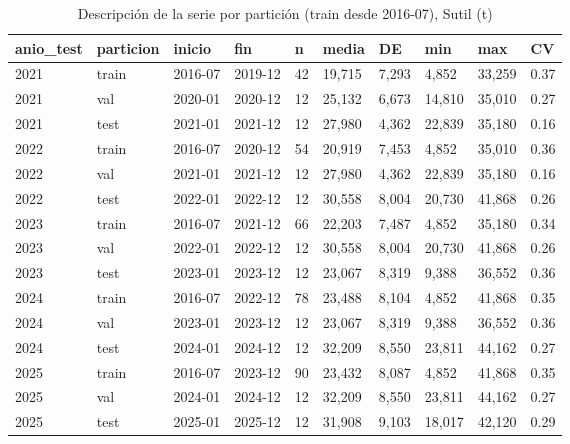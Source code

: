 \begin{table}[H]
\centering
\small
\caption{Descripción de la serie por partición (train desde 2016-07), Sutil (t)}
\label{tab:T03_particiones_sutil}
\begin{tabular}{llllllllll}
\toprule
anio\_test & particion & inicio & fin & n & media & DE & min & max & CV \\
\midrule
2021 & train & 2016-07 & 2019-12 & 42 & 19,715 & 7,293 & 4,852 & 33,259 & 0.37 \\
2021 & val & 2020-01 & 2020-12 & 12 & 25,132 & 6,673 & 14,810 & 35,010 & 0.27 \\
2021 & test & 2021-01 & 2021-12 & 12 & 27,980 & 4,362 & 22,839 & 35,180 & 0.16 \\
2022 & train & 2016-07 & 2020-12 & 54 & 20,919 & 7,453 & 4,852 & 35,010 & 0.36 \\
2022 & val & 2021-01 & 2021-12 & 12 & 27,980 & 4,362 & 22,839 & 35,180 & 0.16 \\
2022 & test & 2022-01 & 2022-12 & 12 & 30,558 & 8,004 & 20,730 & 41,868 & 0.26 \\
2023 & train & 2016-07 & 2021-12 & 66 & 22,203 & 7,487 & 4,852 & 35,180 & 0.34 \\
2023 & val & 2022-01 & 2022-12 & 12 & 30,558 & 8,004 & 20,730 & 41,868 & 0.26 \\
2023 & test & 2023-01 & 2023-12 & 12 & 23,067 & 8,319 & 9,388 & 36,552 & 0.36 \\
2024 & train & 2016-07 & 2022-12 & 78 & 23,488 & 8,104 & 4,852 & 41,868 & 0.35 \\
2024 & val & 2023-01 & 2023-12 & 12 & 23,067 & 8,319 & 9,388 & 36,552 & 0.36 \\
2024 & test & 2024-01 & 2024-12 & 12 & 32,209 & 8,550 & 23,811 & 44,162 & 0.27 \\
2025 & train & 2016-07 & 2023-12 & 90 & 23,432 & 8,087 & 4,852 & 41,868 & 0.35 \\
2025 & val & 2024-01 & 2024-12 & 12 & 32,209 & 8,550 & 23,811 & 44,162 & 0.27 \\
2025 & test & 2025-01 & 2025-12 & 12 & 31,908 & 9,103 & 18,017 & 42,120 & 0.29 \\
\bottomrule
\end{tabular}
\end{table}